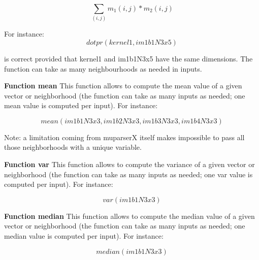 \begin{equation}
\sum_{(i,j)} m_1(i,j)*m_2(i,j)
\end{equation}

For instance: 
\begin{equation}
  dotpr(kernel1,im1b1N3x5)
\end{equation}

is correct provided that kernel1 and im1b1N3x5 have the same dimensions. The function can take as many neighbourhoods as needed in inputs.


\begin{center}
\end{center}

\textbf{Function mean} \newline
This function allows to compute the mean value of a given vector or neighborhood (the function can take
as many inputs as needed; one mean value is computed per input). For instance:

\begin{equation}
	mean(im1b1N3x3,im1b2N3x3,im1b3N3x3,im1b4N3x3)
\end{equation}

Note: a limitation coming from muparserX itself makes impossible to pass all those neighborhoods with a unique variable.

\textbf{Function var} \newline
This function allows to compute the variance of a given vector or neighborhood (the function can take
as many inputs as needed; one var value is computed per input). For instance:

\begin{equation}
	var(im1b1N3x3)
\end{equation} 

\textbf{Function median} \newline
This function allows to compute the median value of a given vector or neighborhood (the function can take
as many inputs as needed; one median value is computed per input). For instance:

\begin{equation}
	median(im1b1N3x3)
\end{equation}


